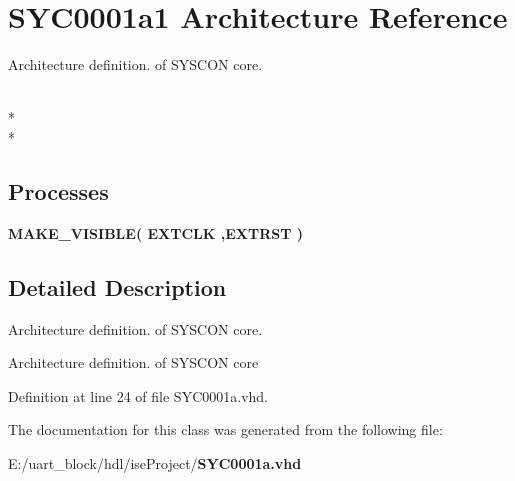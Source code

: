 \section{S\-Y\-C0001a1 Architecture Reference}
\label{class_s_y_c0001a_1_1_s_y_c0001a1}


Architecture definition. of S\-Y\-S\-C\-O\-N core.  


\\*
\\*
\subsection*{Processes}
 \begin{DoxyCompactItemize}
\item 
{\bf M\-A\-K\-E\-\_\-\-V\-I\-S\-I\-B\-L\-E}{\bfseries  ( {\bfseries {\bfseries {\bf E\-X\-T\-C\-L\-K}}   ,{\bfseries {\bf E\-X\-T\-R\-S\-T}}  } )}\label{class_s_y_c0001a_1_1_s_y_c0001a1_a9e8ef5e7a7982d65305afcb2fbcc7b71}

\end{DoxyCompactItemize}


\subsection{Detailed Description}
Architecture definition. of S\-Y\-S\-C\-O\-N core. 

Architecture definition. of S\-Y\-S\-C\-O\-N core 

Definition at line 24 of file S\-Y\-C0001a.\-vhd.



The documentation for this class was generated from the following file\-:\begin{DoxyCompactItemize}
\item 
E\-:/uart\-\_\-block/hdl/ise\-Project/{\bf S\-Y\-C0001a.\-vhd}\end{DoxyCompactItemize}
